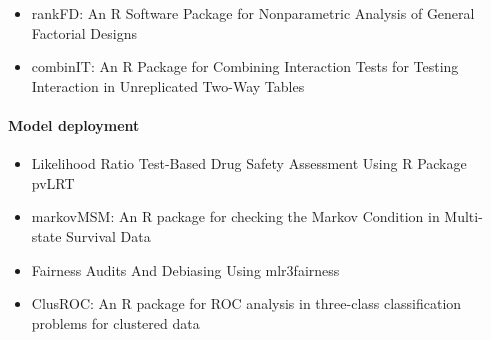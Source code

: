 \begin{itemize}
\tightlist
\item
  rankFD: An R Software Package for Nonparametric Analysis of General Factorial Designs
\item
  combinIT: An R Package for Combining Interaction Tests for Testing Interaction in Unreplicated Two-Way Tables
\end{itemize}

\hypertarget{model-deployment}{%
\paragraph{Model deployment}\label{model-deployment}}

\begin{itemize}
\tightlist
\item
  Likelihood Ratio Test-Based Drug Safety Assessment Using R Package pvLRT
\item
  markovMSM: An R package for checking the Markov Condition in Multi-state Survival Data
\item
  Fairness Audits And Debiasing Using mlr3fairness
\item
  ClusROC: An R package for ROC analysis in three-class classification problems for clustered data
\end{itemize}


\address{%
Simon Urbanek\\
University of Auckland\\%
\\
%
\url{https://journal.r-project.org}\\%
%
\href{mailto:r-journal@r-project.org}{\nolinkurl{r-journal@r-project.org}}%
}
